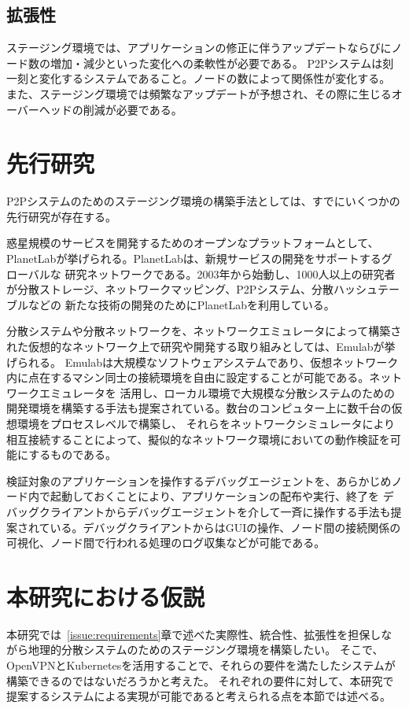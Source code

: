 \subsection{拡張性}
\label{issue:requirements3}
ステージング環境では、アプリケーションの修正に伴うアップデートならびにノード数の増加・減少といった変化への柔軟性が必要である。
P2Pシステムは刻一刻と変化するシステムであること。ノードの数によって関係性が変化する。
また、ステージング環境では頻繁なアップデートが予想され、その際に生じるオーバーヘッドの削減が必要である。

\section{先行研究}
\label{issue:previous-research}
P2Pシステムのためのステージング環境の構築手法としては、すでにいくつかの先行研究が存在する。

惑星規模のサービスを開発するためのオープンなプラットフォームとして、PlanetLabが挙げられる。PlanetLabは、新規サービスの開発をサポートするグローバルな
研究ネットワークである。2003年から始動し、1000人以上の研究者が分散ストレージ、ネットワークマッピング、P2Pシステム、分散ハッシュテーブルなどの
新たな技術の開発のためにPlanetLabを利用している。

分散システムや分散ネットワークを、ネットワークエミュレータによって構築された仮想的なネットワーク上で研究や開発する取り組みとしては、Emulabが挙げられる。
Emulabは大規模なソフトウェアシステムであり、仮想ネットワーク内に点在するマシン同士の接続環境を自由に設定することが可能である。ネットワークエミュレータを
活用し、ローカル環境で大規模な分散システムのための開発環境を構築する手法も提案されている。数台のコンピュター上に数千台の仮想環境をプロセスレベルで構築し、
それらをネットワークシミュレータにより相互接続することによって、擬似的なネットワーク環境においての動作検証を可能にするものである。

検証対象のアプリケーションを操作するデバッグエージェントを、あらかじめノード内で起動しておくことにより、アプリケーションの配布や実行、終了を
デバッグクライアントからデバッグエージェントを介して一斉に操作する手法も提案されている。デバッグクライアントからはGUIの操作、ノード間の接続関係の
可視化、ノード間で行われる処理のログ収集などが可能である。


\section{本研究における仮説}
本研究では~\ref{issue:requirements}章で述べた実際性、統合性、拡張性を担保しながら地理的分散システムのためのステージング環境を構築したい。
そこで、OpenVPNとKubernetesを活用することで、それらの要件を満たしたシステムが構築できるのではないだろうかと考えた。
それぞれの要件に対して、本研究で提案するシステムによる実現が可能であると考えられる点を本節では述べる。

